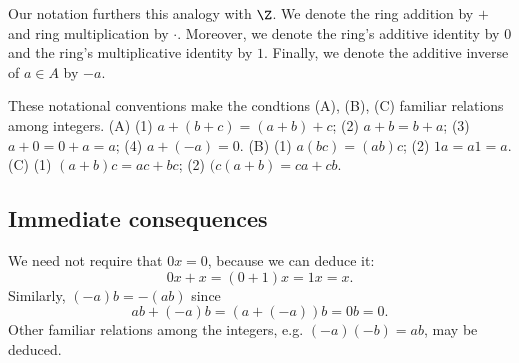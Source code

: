 Our notation furthers this analogy with $\Z $.
We denote the ring addition by $+$ and ring multiplication by $\cdot $.
Moreover, we denote the ring's additive identity by $0$ and the ring's multiplicative identity by $1$.
Finally, we denote the additive inverse of $a \in A$ by $-a$.

These notational conventions make the condtions (A), (B), (C) familiar relations among integers.
(A) (1) $a+(b + c) = (a+b)+c$; (2) $a+b = b+a$; (3) $a + 0 = 0 + a = a$; (4) $a + (-a) = 0$.
(B) (1) $a(bc) = (ab)c$; (2) $1a = a1 = a$.
(C) (1) $(a+b)c = ac + bc$; (2) $(c(a+b) = ca + cb$.

\subsection*{Immediate consequences}

We need not require that $0x = 0$, because we can deduce it:
  \[
0x + x = (0 + 1)x = 1x = x.
  \]
Similarly, $(-a)b = -(ab)$ since
  \[
ab + (-a)b = (a + (-a))b = 0b = 0.
  \]
Other familiar relations among the integers, e.g. $(-a)(-b) = ab$, may be deduced.

